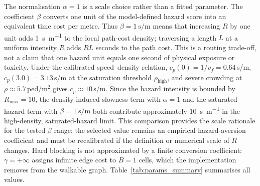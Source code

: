 \documentclass[preprint,12pt]{elsarticle}
\begin{document}
The normalisation $\alpha=1$ is a scale choice rather than a fitted
parameter. The coefficient $\beta$ converts one unit of the model-defined
hazard score into an equivalent time cost per metre. Thus
$\beta=\SI{1}{\second\per\meter}$ means that increasing $R$ by one unit
adds \SI{1}{\second\per\meter} to the local path-cost density; traversing
a length $L$ at a uniform intensity $R$ adds $R L$ seconds to the path
cost. This is a routing trade-off, not a claim that one hazard unit equals
one second of physical exposure or toxicity. Under the calibrated
speed--density relation,
$c_p(0)=1/v_f=0.64$\,s/m, $c_p(3.0)=3.13$\,s/m at the saturation
threshold $\rho_{\mathrm{high}}$, and severe crowding at
$\rho\approx 5.7$\,ped/m$^2$ gives $c_p\approx 10$\,s/m. Since the
hazard intensity is bounded by $R_{\max}=10$, the density-induced
slowness term with $\alpha=1$ and the saturated hazard term with
$\beta=\SI{1}{\second\per\meter}$ both contribute approximately
\SI{10}{\second\per\meter} in the high-density, saturated-hazard limit.
This comparison provides the scale rationale for the tested $\beta$
range; the selected value remains an empirical hazard-aversion
coefficient and must be recalibrated if the definition or numerical scale
of $R$ changes. Hard blocking is not approximated by a finite conversion
coefficient: $\gamma=+\infty$ assigns infinite edge cost to $B=1$ cells,
which the implementation removes from the walkable graph.
Table~\ref{tab:params_summary} summarises all values.
\end{document}

